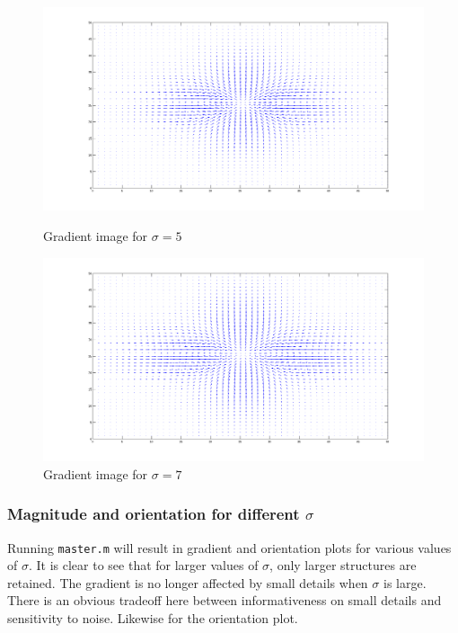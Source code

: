 \documentclass[a4paper,10pt]{article}
\begin{document}
\begin{figure}[ht]
\begin{minipage}[b]{0.45\linewidth}
\centering
\includegraphics[width=\textwidth]{quiver_sigma5}
\caption{Gradient image for $\sigma=5$}
\end{minipage}
\hspace{0.1cm}
\begin{minipage}[b]{0.45\linewidth}
\centering
\includegraphics[width=\textwidth]{quiver_sigma7}
\caption{Gradient image for $\sigma=7$}
\end{minipage}
\end{figure}

\subsubsection{Magnitude and orientation for different $\sigma$}
Running \verb+master.m+ will result in gradient and orientation plots for various values of $\sigma$.
It is clear to see that for larger values of $\sigma$, only larger structures are retained.
The gradient is no longer affected by small details when $\sigma$ is large.
There is an obvious tradeoff here  between informativeness on small details and sensitivity to noise.
Likewise for the orientation plot.
\end{document}
